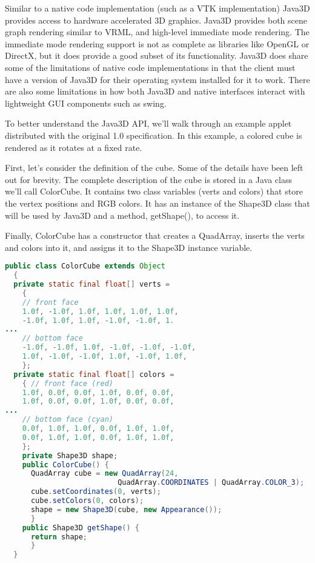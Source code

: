 Similar to a native code implementation (such as a VTK implementation) Java3D provides access to hardware accelerated 3D graphics. Java3D provides both scene graph rendering similar to VRML, and high-level immediate mode rendering. The immediate mode rendering support is not as complete as libraries like OpenGL or DirectX, but it does provide a good subset of its functionality. Java3D does share some of the limitations of native code implementations in that the client must have a version of Java3D for their operating system installed for it to work. There are also some limitations in how both Java3D and native interfaces interact with lightweight GUI components such as swing.

To better understand the Java3D API, we’ll walk through an example applet distributed with the original 1.0 specification. In this example, a colored cube is rendered as it rotates at a fixed rate.

First, let's consider the definition of the cube. Some of the details have been left out for brevity. The complete description of the cube is stored in a Java class we’ll call ColorCube. It contains two class variables (verts and colors) that store the vertex positions and RGB colors. It has an instance of the Shape3D class that will be used by Java3D and a method, getShape(), to access it.

Finally, ColorCube has a constructor that creates a QuadArray, inserts the verts and colors into it, and assigns it to the Shape3D instance variable.

\begin{lstlisting}[language=Java, caption={}, numbers=none, frame=none]
public class ColorCube extends Object
  {
  private static final float[] verts =
    {
    // front face
    1.0f, -1.0f, 1.0f, 1.0f, 1.0f, 1.0f,
    -1.0f, 1.0f, 1.0f, -1.0f, -1.0f, 1.
...
    // bottom face
    -1.0f, -1.0f, 1.0f, -1.0f, -1.0f, -1.0f,
    1.0f, -1.0f, -1.0f, 1.0f, -1.0f, 1.0f,
    };
  private static final float[] colors =
    { // front face (red)
    1.0f, 0.0f, 0.0f, 1.0f, 0.0f, 0.0f,
    1.0f, 0.0f, 0.0f, 1.0f, 0.0f, 0.0f,
...
    // bottom face (cyan)
    0.0f, 1.0f, 1.0f, 0.0f, 1.0f, 1.0f,
    0.0f, 1.0f, 1.0f, 0.0f, 1.0f, 1.0f,
    };
    private Shape3D shape;
    public ColorCube() {
      QuadArray cube = new QuadArray(24,
                          QuadArray.COORDINATES | QuadArray.COLOR_3);
      cube.setCoordinates(0, verts);
      cube.setColors(0, colors);
      shape = new Shape3D(cube, new Appearance());
      }
    public Shape3D getShape() {
      return shape;
      }
  }
\end{lstlisting}

